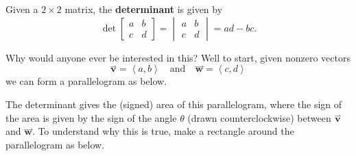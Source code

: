 \documentclass{ximera}
\begin{document}
\begin{definition}
  Given a $2\times2$ matrix, the \textbf{determinant} is given by
  \[
  \det
  \begin{bmatrix}
    a & b\\
    c & d
  \end{bmatrix}
  =
  \begin{vmatrix}
    a & b\\
    c & d
  \end{vmatrix}
  = ad -bc.
  \]
\end{definition}
Why would anyone ever be interested in this? Well to start, given nonzero vectors
\[
\overset{\boldsymbol{\rightharpoonup}}{\mathbf{v}} = \left< a,b \right> \quad\text{and}\quad \overset{\boldsymbol{\rightharpoonup}}{\mathbf{w}} = \left< c,d \right>
\]
we can form a parallelogram as below.
\begin{image}
\end{image}
The determinant gives the (signed) area of this parallelogram, where
the sign of the area is given by the sign of the angle $\theta$ (drawn
counterclockwise) between $\overset{\boldsymbol{\rightharpoonup}}{\mathbf{v}}$ and $\overset{\boldsymbol{\rightharpoonup}}{\mathbf{w}}$. To understand why
this is true, make a rectangle around the parallelogram as below.
\end{document}
